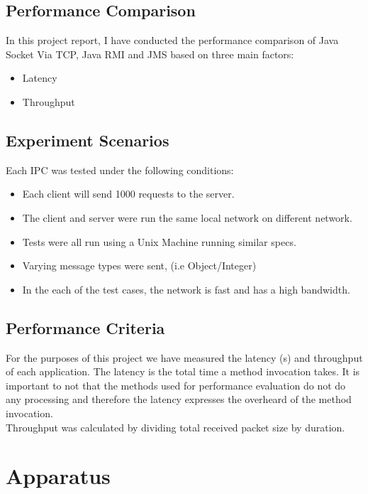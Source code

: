 \documentclass{article}
\begin{document}
\subsection{Performance Comparison}
In this project report, I have conducted the performance comparison of Java Socket Via TCP, Java RMI and JMS based on three main factors:
\begin{itemize}
\item Latency
\item Throughput
\end{itemize}

\subsection{Experiment Scenarios}
Each IPC was tested under the following conditions:
\begin{itemize}
\item Each client will send 1000 requests to the server.
\item The client and server were run the same local network
on different network.
\item Tests were all run using a Unix Machine running similar specs. 
\item Varying message types were sent, (i.e Object/Integer)
\item In the each of the test cases, the network is fast and has a high bandwidth.
\end{itemize}

\subsection{Performance Criteria}
For the purposes of this project we have measured the latency (s) and throughput of each application. The latency is the total time a method invocation takes. It is important to not that the methods used for performance evaluation do not do any processing and therefore the latency expresses the overheard of the method invocation. \\

Throughput was calculated by dividing total received packet size by duration. \\



\section{Apparatus}
\end{document}
